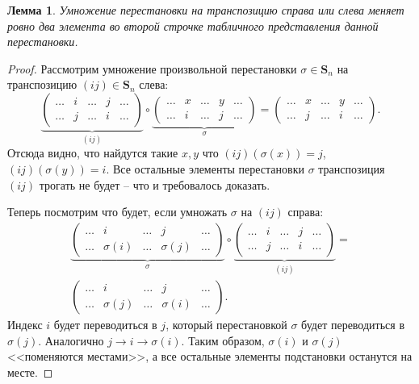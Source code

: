 \documentclass{article}
\newtheorem{lemma}{Лемма}[section]
\begin{document}
\begin{lemma} \label{klTl}
    Умножение перестановки на транспозицию справа или слева меняет ровно два элемента во второй строчке табличного представления данной перестановки.
\end{lemma}
\begin{proof}
    Рассмотрим умножение произвольной перестановки $\sigma \in \mathbf{S}_n$ на транспозицию $(ij) \in \mathbf{S}_n$ слева:
    \[
        \underbrace{
            \begin{pmatrix}
                \dots & i & \dots & j & \dots \\
                \dots & j & \dots & i & \dots
            \end{pmatrix}
        }_{(ij)}
        \circ
        \underbrace{
            \begin{pmatrix}
                \dots & x & \dots & y & \dots \\
                \dots & i & \dots & j & \dots
            \end{pmatrix}
        }_{\sigma}
        =
        \begin{pmatrix}
            \dots & x & \dots & y & \dots \\
            \dots & j & \dots & i & \dots
        \end{pmatrix}.
    \]
    Отсюда видно, что найдутся такие $x, y$ что $(ij) (\sigma (x)) = j$, $(ij) (\sigma(y)) = i$. Все остальные элементы перестановки $\sigma$ транспозиция $(ij)$ трогать не будет -- что и требовалось доказать.

    Теперь посмотрим что будет, если умножать $\sigma$ на $(ij)$ справа:
    \begin{multline*}
        \underbrace{
            \begin{pmatrix}
                \dots & i & \dots & j & \dots \\
                \dots & \sigma(i) & \dots & \sigma(j) & \dots
            \end{pmatrix}
        }_{\sigma}
        \circ
        \underbrace{
            \begin{pmatrix}
                \dots & i & \dots & j & \dots \\
                \dots & j & \dots & i & \dots
            \end{pmatrix}
        }_{(ij)}
        = \\
        \begin{pmatrix}
            \dots & i & \dots & j & \dots \\
            \dots & \sigma(j) & \dots & \sigma(i) & \dots
        \end{pmatrix}.
    \end{multline*}
    Индекс $i$ будет переводиться в $j$, который перестановкой $\sigma$ будет переводиться в $\sigma(j)$. Аналогично $j \rightarrow i \rightarrow \sigma(i)$. Таким образом, $\sigma(i)$ и $\sigma(j)$ <<поменяются местами>>, а все остальные элементы подстановки останутся на месте.
\end{proof}
\end{document}
